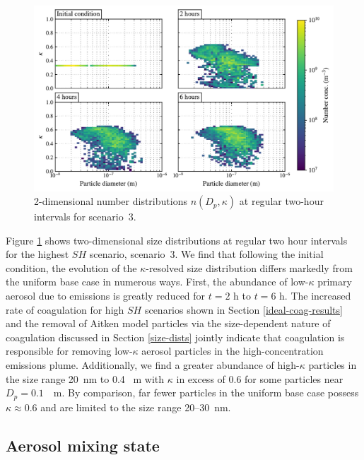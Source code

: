 \begin{figure}[!t]
  \centering
    \includegraphics[width=\textwidth]{figures/chapter5/2d-kappa-dist-4-panel-point-source-1x1-z40.pdf}
    \caption{2-dimensional number distributions $n(D_p, \kappa)$ at regular two-hour intervals for scenario~3.}
    \label{fig:2d-kappa-dist-s3}
\end{figure}

Figure \ref{fig:2d-kappa-dist-s3} shows two-dimensional size distributions at regular two hour intervals for the highest $SH$ scenario, scenario~3. We find that following the initial condition, the evolution of the $\kappa$-resolved size distribution differs markedly from the uniform base case in numerous ways. First, the abundance of low-$\kappa$ primary aerosol due to emissions is greatly reduced for $t=2$ h to $t=6$ h. The increased rate of coagulation for high $SH$ scenarios shown in Section \ref{ideal-coag-results} and the removal of Aitken model particles via the size-dependent nature of coagulation discussed in Section \ref{size-dists} jointly indicate that coagulation is responsible for removing  low-$\kappa$ aerosol particles in the high-concentration emissions plume. Additionally, we find a greater abundance of high-$\kappa$ particles in the size range 20~nm to 0.4 \si{\mu m} with $\kappa$ in excess of 0.6 for some particles near $D_p=0.1$~\si{\mu m}. By comparison, far fewer particles in the uniform base case possess $\kappa\approx0.6$ and are limited to the size range 20--30~nm. 

\subsection{Aerosol mixing state}

